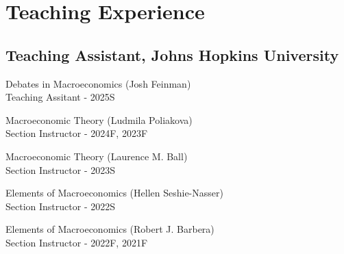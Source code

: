 
\section{Teaching Experience}
\vspace{-0.25in}

\subsection*{Teaching Assistant, Johns Hopkins University}
\begin{outerlist}
        \item Debates in Macroeconomics (Josh Feinman) \\
    Teaching Assitant  - 2025S
	\item Macroeconomic Theory (Ludmila Poliakova) \\
    Section Instructor - 2024F, 2023F
	\item Macroeconomic Theory (Laurence M. Ball) \\
    Section Instructor - 2023S
    \item Elements of Macroeconomics (Hellen Seshie-Nasser) \\
    Section Instructor - 2022S
    \item Elements of Macroeconomics (Robert J. Barbera) \\
      Section Instructor - 2022F, 2021F
\end{outerlist}
